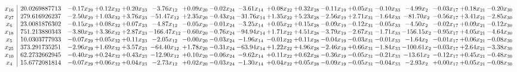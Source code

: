 \documentclass[9pt]{article}
\begin{document}
 \[\begin{array}{c| c c@{\hskip 2pt} c@{\hskip 2pt} c@{\hskip 2pt} c@{\hskip 2pt} c@{\hskip 2pt} c@{\hskip 2pt} c@{\hskip 2pt} c@{\hskip 2pt} c@{\hskip 2pt} c@{\hskip 2pt} c@{\hskip 2pt} c@{\hskip 2pt} c@{\hskip 2pt} c@{\hskip 2pt} c@{\hskip 2pt} c@{\hskip 2pt} }
 x_{16}   &  20.0269887713 & -0.17 x_{29} & +  0.12 x_{32} & +  0.20 x_{23} & -3.76 x_{12} & +  0.09 x_{20} & -0.02 x_{24} & -3.61 x_{14} & +  0.08 x_{22} & +  0.32 x_{28} & -0.11 x_{19} & +  0.05 x_{31} & -0.10 x_{33} & -4.99 x_{2} & -0.03 x_{17} & +  0.18 x_{21} & -0.20 x_{30}\\
 x_{27}   &  279.616926237 & -2.50 x_{29} & +  1.03 x_{32} & +  3.76 x_{23} & -51.47 x_{12} & +  2.35 x_{20} & -0.43 x_{24} & -31.76 x_{14} & +  1.35 x_{22} & +  5.23 x_{28} & -2.56 x_{19} & +  2.71 x_{31} & -1.64 x_{33} & -81.70 x_{2} & -0.56 x_{17} & +  3.41 x_{21} & -2.85 x_{30}\\
 x_{6}   &  23.0081876302 & -0.15 x_{29} & +  0.08 x_{32} & +  0.07 x_{23} & -4.87 x_{12} & -0.05 x_{20} & -0.01 x_{24} & -3.25 x_{14} & +  0.05 x_{22} & +  0.15 x_{28} & -0.09 x_{19} & -0.12 x_{31} & -0.05 x_{33} & -4.50 x_{2} & -0.02 x_{17} & +  0.09 x_{21} & -0.12 x_{30}\\
 x_{18}   &  751.213880343 & -3.80 x_{29} & +  3.36 x_{32} & +  2.87 x_{23} & -166.47 x_{12} & -0.60 x_{20} & -0.76 x_{24} & -94.94 x_{14} & +  1.71 x_{22} & +  4.51 x_{28} & -3.79 x_{19} & -2.67 x_{31} & -1.71 x_{33} & -156.15 x_{2} & -0.95 x_{17} & +  4.05 x_{21} & -4.64 x_{30}\\
 x_{5}   &  10.0303777933 & -0.07 x_{29} & +  0.05 x_{32} & +  0.11 x_{23} & -2.05 x_{12} & -0.00 x_{20} & -0.03 x_{24} & -1.96 x_{14} & -0.01 x_{22} & +  0.11 x_{28} & -0.04 x_{19} & -0.03 x_{31} & -0.01 x_{33} & -1.64 x_{2} & -0.01 x_{17} & +  0.06 x_{21} & -0.08 x_{30}\\
 x_{25}   &  373.291735251 & -2.96 x_{29} & +  1.69 x_{32} & +  3.57 x_{23} & -64.40 x_{12} & +  1.78 x_{20} & -0.31 x_{24} & -63.94 x_{14} & +  1.22 x_{22} & +  4.96 x_{28} & -2.46 x_{19} & +  0.66 x_{31} & -1.84 x_{33} & -100.61 x_{2} & -0.03 x_{17} & +  2.64 x_{21} & -3.38 x_{30}\\
 x_{10}   &  62.2732662945 & -0.40 x_{29} & +  0.24 x_{32} & +  0.43 x_{23} & -12.90 x_{12} & +  0.10 x_{20} & -0.06 x_{24} & -9.62 x_{14} & +  0.11 x_{22} & +  0.62 x_{28} & -0.36 x_{19} & -0.05 x_{31} & -0.21 x_{33} & -13.61 x_{2} & -0.12 x_{17} & +  0.45 x_{21} & -0.48 x_{30}\\
 x_{4}   &  15.6772081814 & -0.07 x_{29} & +  0.06 x_{32} & +  0.04 x_{23} & -2.73 x_{12} & +  0.02 x_{20} & -0.03 x_{24} & -1.30 x_{14} & +  0.04 x_{22} & +  0.05 x_{28} & -0.09 x_{19} & -0.05 x_{31} & -0.04 x_{33} & -2.93 x_{2} & +  0.00 x_{17} & +  0.05 x_{21} & -0.08 x_{30}\\

\end{array}\]
\end{document}
